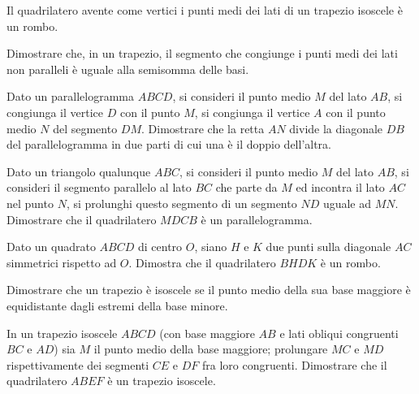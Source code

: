 \begin{multicols}{2}
\begin{esercizio}
\label{ese:4.37}
Il quadrilatero avente come vertici i punti medi dei lati di un trapezio isoscele è un rombo.
\end{esercizio}

\begin{esercizio}
\label{ese:4.38}
Dimostrare che, in un trapezio, il segmento che congiunge i punti medi dei lati non paralleli è uguale alla semisomma delle basi.
\end{esercizio}

\begin{esercizio}
\label{ese:4.39}
Dato un parallelogramma $ABCD$, si consideri il punto medio $M$ del lato $AB$, si congiunga il vertice $D$ con il punto $M$, si congiunga il vertice $A$ con il punto medio $N$ del segmento $DM$. Dimostrare che la retta $AN$ divide la diagonale $DB$ del parallelogramma in due parti di cui una è il doppio dell'altra.
\end{esercizio}

\begin{esercizio}
\label{ese:4.40}
Dato un triangolo qualunque $ABC$, si consideri il punto medio $M$ del lato $AB$, si consideri il segmento parallelo al lato $BC$ che parte da $M$ ed incontra il lato $AC$ nel punto $N$, si prolunghi questo segmento di un segmento $ND$ uguale ad $MN$. Dimostrare che il quadrilatero $MDCB$ è un parallelogramma.
\end{esercizio}

\begin{esercizio}
\label{ese:4.41}
Dato un quadrato $ABCD$ di centro $O$, siano $H$ e $K$ due punti sulla diagonale $AC$ simmetrici rispetto ad $O$. Dimostra che il quadrilatero $BHDK$ è un rombo. 
\end{esercizio}

\begin{esercizio}
\label{ese:4.42}
Dimostrare che un trapezio è isoscele se il punto medio della sua base maggiore è equidistante dagli estremi della base minore.
\end{esercizio}

\begin{esercizio}
\label{ese:4.43}
In un trapezio isoscele $ABCD$ (con base maggiore $AB$ e lati obliqui congruenti $BC$ e $AD$) sia $M$ il punto medio della base maggiore; prolungare $MC$ e $MD$ rispettivamente dei segmenti $CE$ e $DF$ fra loro congruenti. Dimostrare che il quadrilatero $ABEF$ è un trapezio isoscele.
\end{esercizio}


\end{multicols}
